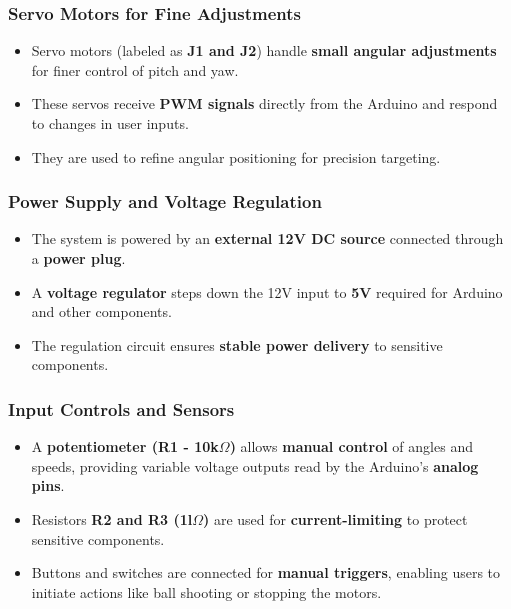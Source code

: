 \documentclass[12pt]{report}
\begin{document}
\subsubsection{Servo Motors for Fine Adjustments}

\begin{itemize}
    \item Servo motors (labeled as \textbf{J1 and J2}) handle \textbf{small angular adjustments} for finer control of pitch and yaw.
    \item These servos receive \textbf{PWM signals} directly from the Arduino and respond to changes in user inputs.
    \item They are used to refine angular positioning for precision targeting.
\end{itemize}

\subsubsection{Power Supply and Voltage Regulation}

\begin{itemize}
    \item The system is powered by an \textbf{external 12V DC source} connected through a \textbf{power plug}.
    \item A \textbf{voltage regulator} steps down the 12V input to \textbf{5V} required for Arduino and other components.
    \item The regulation circuit ensures \textbf{stable power delivery} to sensitive components.
\end{itemize}

\subsubsection{Input Controls and Sensors}

\begin{itemize}
    \item A \textbf{potentiometer (R1 - 10k{$\Omega$})} allows \textbf{manual control}  of angles and speeds, providing variable voltage outputs read by the Arduino’s \textbf{analog pins}.
    \item Resistors \textbf{R2 and R3 (1l{$\Omega$})} are used for \textbf{current-limiting} to protect sensitive components.
    \item Buttons and switches are connected for \textbf{manual triggers}, enabling users to initiate actions like ball shooting or stopping the motors.
\end{itemize}
\end{document}
